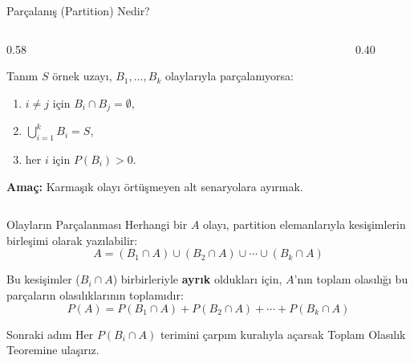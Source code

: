 \documentclass[light]{lutbeamer}
\begin{document}
\begin{frame}{Parçalanış (Partition) Nedir?}
    \begin{columns}[T]
        \begin{column}{0.58\textwidth}
            \begin{block}{Tanım}
                \(S\) örnek uzayı, \(B_1,\dots,B_k\) olaylarıyla parçalanıyorsa:
                \begin{enumerate}
                    \item \(i\neq j\) için \(B_i\cap B_j=\emptyset\),
                    \item \(\bigcup_{i=1}^{k} B_i=S\),
                    \item her \(i\) için \(P(B_i)>0\).
                \end{enumerate}
            \end{block}
            \textbf{Amaç:} Karmaşık olayı örtüşmeyen alt senaryolara ayırmak.
        \end{column}
        \begin{column}{0.40\textwidth}
            \centering
        \end{column}
    \end{columns}
\end{frame}

\begin{frame}{Olayların Parçalanması}
    Herhangi bir $A$ olayı, partition elemanlarıyla kesişimlerin birleşimi olarak yazılabilir:
    \[
    A = (B_1 \cap A) \cup (B_2 \cap A) \cup \cdots \cup (B_k \cap A)
    \]

    Bu kesişimler ($B_i \cap A$) birbirleriyle \textbf{ayrık} oldukları için, $A$'nın toplam olasılığı bu parçaların olasılıklarının toplamıdır:
    \[
    P(A) = P(B_1 \cap A) + P(B_2 \cap A) + \cdots + P(B_k \cap A)
    \]

    \begin{block}{Sonraki adım}
        Her $P(B_i \cap A)$ terimini çarpım kuralıyla açarsak Toplam Olasılık Teoremine ulaşırız.
    \end{block}
\end{frame}
\end{document}
